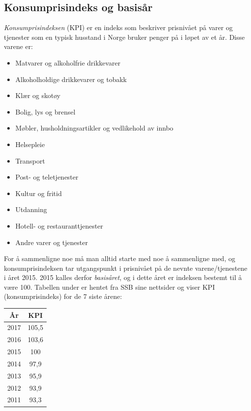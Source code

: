 \subsection{Konsumprisindeks og basisår}
\textit{Konsumprisindeksen} (KPI) er en indeks som beskriver prisnivået på varer og tjenester som en typisk husstand i Norge bruker penger på i løpet av et år. Disse varene er:

\parbox[t]{0.49\linewidth}{\begin{itemize}
		\item Matvarer og alkoholfrie drikkevarer
		\item Alkoholholdige drikkevarer og tobakk
		\item Klær og skotøy
		\item Bolig, lys og brensel
		\item Møbler, husholdningsartikler og vedlikehold av innbo
		\item Helsepleie
\end{itemize}}
\parbox[t]{0.49\linewidth}{\begin{itemize}
		\item Transport
		\item Post- og teletjenester
		\item Kultur og fritid
		\item Utdanning
		\item Hotell- og restauranttjenester
		\item Andre varer og tjenester
\end{itemize}}
For å sammenligne noe må man alltid starte med noe å sammenligne med, og konsumprisindeksen tar utgangspunkt i prisnivået på de nevnte varene/tjenestene i året 2015. 2015 kalles derfor \textit{basisåret}, og i dette året er indeksen bestemt til å være 100.\regv
{}\regv
Tabellen under er hentet fra SSB sine nettsider og viser KPI (konsumprisindeks) for de 7 siste årene:
\begin{center}
	\begin{tabular}{c|c}
		År &  KPI \\ \hline
		2017&	105,5\\
		2016&	103,6\\
		2015&	100\\
		2014&	97,9\\
		2013&	95,9\\
		2012&	93,9\\
		2011&	93,3\\
	\end{tabular}
\end{center}
